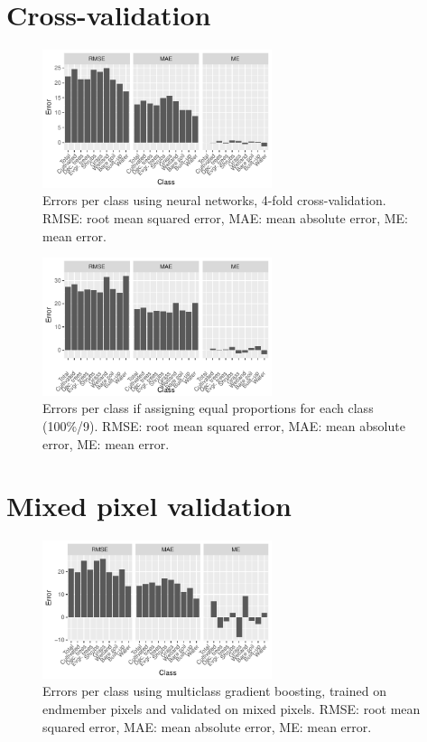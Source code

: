 \documentclass[a4paper,12pt]{scrbook}
\begin{document}
\begin{appendices}
 \section{Cross-validation}
 \begin{figure}[!h]
  \centering
  \includegraphics[width=0.6\textwidth]{thesis-figures/perclass-errors-nn}
  \caption{Errors per class using neural networks, 4-fold cross-validation. RMSE: root mean squared error, MAE: mean absolute error, ME: mean error.}
  \label{fig-perclass-errors-nn}
 \end{figure}
 \begin{figure}[!h]
  \centering
  \includegraphics[width=0.6\textwidth]{thesis-figures/perclass-errors-ctrl}
  \caption{Errors per class if assigning equal proportions for each class (100\%/9). RMSE: root mean squared error, MAE: mean absolute error, ME: mean error.}
  \label{fig-perclass-errors-ctrl}
 \end{figure}
 
 \section{Mixed pixel validation}
 \begin{figure}[!h]
  \centering
  \includegraphics[width=0.6\textwidth]{thesis-figures/perclass-errors-gb}
  \caption{Errors per class using multiclass gradient boosting, trained on endmember pixels and validated on mixed pixels. RMSE: root mean squared error, MAE: mean absolute error, ME: mean error.}
  \label{fig-perclass-errors-gb}
 \end{figure}
 

\end{appendices}
\end{document}
